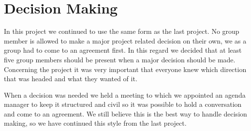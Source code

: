 \section{Decision Making}
In this project we continued to use the same form as the last project. No group member is allowed to make a major project related decision on their own, we as a group had to come to an agreement first. In this regard we decided that at least five group members should be present when a major decision should be made. Concerning the project it was very important that everyone knew which direction that was headed and what they wanted of it.

When a decision was needed we held a meeting to which we appointed an agenda manager to keep it structured and civil so it was possible to hold a conversation and come to an agreement.
We still believe this is the best way to handle decision making, so we have continued this style from the last project.